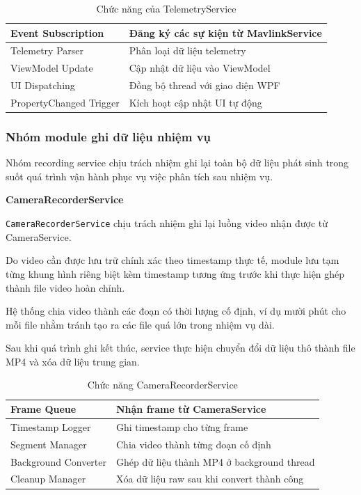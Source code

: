 \documentclass[../DoAn.tex]{subfiles}
\begin{document}
\begin{table}[H]
\centering
\begin{tabular}{|l|p{9cm}|}
\hline
Event Subscription &
Đăng ký các sự kiện từ MavlinkService\\
\hline
Telemetry Parser &
Phân loại dữ liệu telemetry\\
\hline
ViewModel Update &
Cập nhật dữ liệu vào ViewModel\\
\hline
UI Dispatching &
Đồng bộ thread với giao diện WPF\\
\hline
PropertyChanged Trigger &
Kích hoạt cập nhật UI tự động\\
\hline
\end{tabular}
\caption{Chức năng của TelemetryService}
\end{table}

\subsubsection{Nhóm module ghi dữ liệu nhiệm vụ}

Nhóm recording service chịu trách nhiệm ghi lại toàn bộ dữ liệu phát sinh
trong suốt quá trình vận hành phục vụ việc phân tích sau nhiệm vụ.

\subsubsubsection\textbf{CameraRecorderService}

\texttt{CameraRecorderService} chịu trách nhiệm ghi lại luồng video nhận
được từ CameraService.

Do video cần được lưu trữ chính xác theo timestamp thực tế, module lưu
tạm từng khung hình riêng biệt kèm timestamp tương ứng trước khi thực
hiện ghép thành file video hoàn chỉnh.

Hệ thống chia video thành các đoạn có thời lượng cố định, ví dụ mười
phút cho mỗi file nhằm tránh tạo ra các file quá lớn trong nhiệm vụ dài.

Sau khi quá trình ghi kết thúc, service thực hiện chuyển đổi dữ liệu thô
thành file MP4 và xóa dữ liệu trung gian.

\begin{table}[H]
\centering
\begin{tabular}{|l|p{9cm}|}
\hline
Frame Queue &
Nhận frame từ CameraService\\
\hline
Timestamp Logger &
Ghi timestamp cho từng frame\\
\hline
Segment Manager &
Chia video thành từng đoạn cố định\\
\hline
Background Converter &
Ghép dữ liệu thành MP4 ở background thread\\
\hline
Cleanup Manager &
Xóa dữ liệu raw sau khi convert thành công\\
\hline
\end{tabular}
\caption{Chức năng CameraRecorderService}
\end{table}
\end{document}
